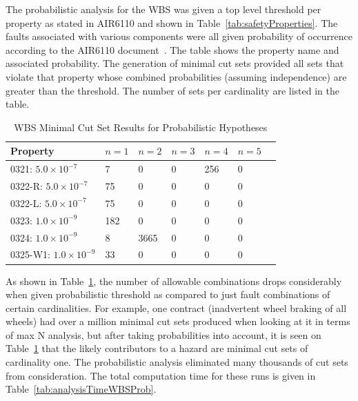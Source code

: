 The probabilistic analysis for the WBS was given a top level threshold per property as stated in AIR6110 and shown in Table~\ref{tab:safetyProperties}. The faults associated with various components were all given probability of occurrence according to the AIR6110 document~\cite{AIR6110}. The table shows the property name and associated probability. The generation of minimal cut sets provided all sets that violate that property whose combined probabilities (assuming independence) are greater than the threshold. The number of sets per cardinality are listed in the table. 

\begin{table}[htbp]
\begin{center}
    \begin{tabular}{ | l | l | l | l | l | l | l | }
    \hline
    \textbf{Property} & $n=1$ & $n=2$ & $n=3$ & $n=4$ 
		& $n=5$    \\ \hline \hline
    0321: $5.0 \times 10^{-7}$ & 7 & 0 & 0 & 256 & 0   \\ \hline
    0322-R: $5.0 \times 10^{-7}$ & 75 & 0 & 0 &0 &0   \\ \hline
    0322-L: $5.0 \times 10^{-7}$ & 75 & 0 & 0 & 0 & 0    \\ \hline
    0323: $1.0 \times 10^{-9}$ & 182 & 0 & 0 & 0 & 0    \\ \hline
    0324: $1.0 \times 10^{-9}$ & 8 & 3665 & 0 & 0 & 0   \\ \hline
    0325-W1: $1.0 \times 10^{-9}$ & 33 & 0 & 0 &0 &0    \\ \hline
    \end{tabular}
    \caption{WBS Minimal Cut Set Results for Probabilistic Hypotheses}
    \label{tab:wbs_prob_results}
    \end{center}
\end{table}

As shown in Table~\ref{tab:wbs_prob_results}, the number of allowable combinations drops considerably when given probabilistic threshold as compared to just fault combinations of certain cardinalities. For example, one contract (inadvertent wheel braking of all wheels) had over a million minimal cut sets produced when looking at it in terms of max N analysis, but after taking probabilities into account, it is seen on Table~\ref{tab:wbs_prob_results} that the likely contributors to a hazard are minimal cut sets of cardinality one. The probabilistic analysis eliminated many thousands of cut sets from consideration. The total computation time for these runs is given in Table~\ref{tab:analysisTimeWBSProb}.


